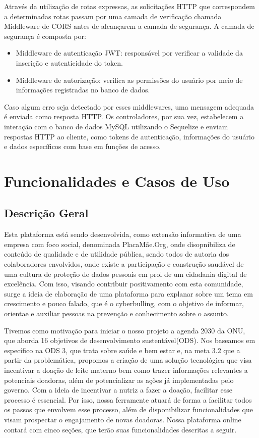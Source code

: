 Através da utilização de rotas expressas, as solicitações HTTP que correspondem a determinadas rotas passam por uma camada de verificação chamada Middleware de CORS antes de alcançarem a camada de segurança.
A camada de segurança é composta por:
\begin{itemize}
  \item Middleware de autenticação JWT: responsável por verificar a validade da inscrição e autenticidade do token.
  \item Middleware de autorização: verifica as permissões do usuário por meio de informações registradas no banco de dados.
\end{itemize}
Caso algum erro seja detectado por esses middlewares, uma mensagem adequada é enviada como resposta HTTP.
Os controladores, por sua vez, estabelecem a interação com o banco de dados MySQL utilizando o Sequelize e enviam respostas HTTP ao cliente, como tokens de autenticação, informações do usuário e dados específicos com base em funções de acesso.



\chapter{Funcionalidades e Casos de Uso}
\section{Descrição Geral}
\label{sec:descricao}
Esta plataforma está sendo desenvolvida, como extensão informativa de uma empresa com foco social, denominada PlacaMãe.Org, onde disopnibiliza de conteúdo de qualidade e de utilidade pública, sendo todos de autoria dos colaboradores envolvidos, onde existe a participação e construção saudável de uma cultura de proteção de dados pessoais em prol de um cidadania digital de excelência.
Com isso, visando contribuir positivamento com esta comunidade, surge a ideia de elaboração de uma plataforma para explanar sobre um tema em crescimento e pouco falado, que é o cyberbulling, com o objetivo de informar, orientae e auxiliar pessoas na prevenção e conhecimento sobre o assunto.


Tivemos como motivação para iniciar o nosso projeto a agenda 2030 da ONU, que aborda 16 objetivos de desenvolvimento sustentável(ODS). Nos baseamos em específico na ODS 3, que trata sobre saúde e bem estar e, na meta 3.2 que
a partir da problemática, propomos a criação de uma solução tecnológica que visa incentivar a doação de leite materno bem como trazer informações relevantes a potenciais doadoras, além de potencializar as ações já implementadas pelo governo.
Com a ideia de incentivar a nutriz a fazer a doação, facilitar esse processo é essencial. Por isso, nossa ferramente atuará de forma a facilitar todos os passos que envolvem esse processo, além de disponibilizar funcionalidades que visam prospectar o engajamento de novas doadoras. 
Nossa plataforma online contará com cinco seções, que terão suas funcionalidades descritas a seguir. 

